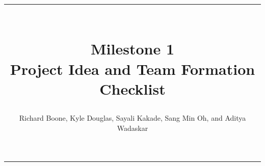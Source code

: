 \documentclass[12pt]{article}
\title{\rule{7in}{1pt} \\
	Milestone 1 \\ 
	\Large Project Idea and Team Formation Checklist}
\author{Richard Boone, Kyle Douglas, Sayali Kakade, Sang Min Oh, and Aditya Wadaskar}
\begin{document}
\maketitle\vspace{-45pt}

\begin{center}
\rule{7in}{1pt}
\end{center}






\end{document}
